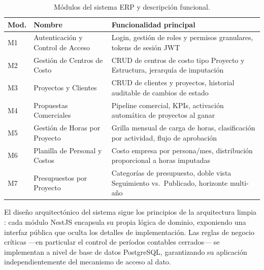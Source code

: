 \documentclass{univalle-perfil}
\begin{document}
\begin{table}[H]
\centering
\caption{Módulos del sistema ERP y descripción funcional.}
{\renewcommand{\arraystretch}{1.4}
\begin{tabular}{|p{}|p{}|p{}|}
\hline
\textbf{Mod.} & \textbf{Nombre} & \textbf{Funcionalidad principal} \\
\hline
M1 & Autenticación y Control de Acceso & Login, gestión de roles y permisos granulares, tokens de sesión JWT \\
\hline
M2 & Gestión de Centros de Costo & CRUD de centros de costo tipo Proyecto y Estructura, jerarquía de imputación \\
\hline
M3 & Proyectos y Clientes & CRUD de clientes y proyectos, historial auditable de cambios de estado \\
\hline
M4 & Propuestas Comerciales & Pipeline comercial, KPIs, activación automática de proyectos al ganar \\
\hline
M5 & Gestión de Horas por Proyecto & Grilla mensual de carga de horas, clasificación por actividad, flujo de aprobación \\
\hline
M6 & Planilla de Personal y Costos & Costo empresa por persona/mes, distribución proporcional a horas imputadas \\
\hline
M7 & Presupuestos por Proyecto & Categorías de presupuesto, doble vista Seguimiento vs.\ Publicado, horizonte multi-año \\
\hline
\end{tabular}}
\end{table}

El diseño arquitectónico del sistema sigue los principios de la arquitectura limpia \parencite{martin2017}: cada módulo NestJS encapsula su propia lógica de dominio, exponiendo una interfaz pública que oculta los detalles de implementación. Las reglas de negocio críticas —en particular el control de períodos contables cerrados— se implementan a nivel de base de datos PostgreSQL, garantizando su aplicación independientemente del mecanismo de acceso al dato.
\end{document}
